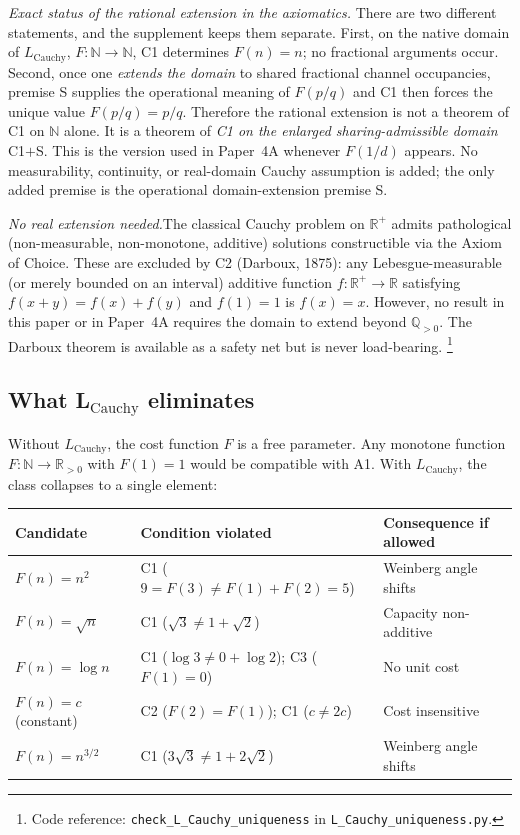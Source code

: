 \documentclass[11pt]{article}
\theoremstyle{definition}
\newcommand{\coderef}[2]{\footnote{Code reference: \texttt{#1} in \texttt{#2}.}}
\begin{document}
\smallskip\noindent\textit{Exact status of the rational extension in the axiomatics.}\quad
There are two different statements, and the supplement keeps them separate.
First, on the native domain of $L_{\mathrm{Cauchy}}$, $F:\mathbb{N}\to\mathbb{N}$, C1 determines $F(n)=n$; no fractional arguments occur.  Second, once one \emph{extends the domain} to shared fractional channel occupancies, premise S supplies the operational meaning of $F(p/q)$ and C1 then forces the unique value $F(p/q)=p/q$.  Therefore the rational extension is not a theorem of C1 on $\mathbb{N}$ alone.  It is a theorem of \emph{C1 on the enlarged sharing-admissible domain} C1$+$S.  This is the version used in Paper~4A whenever $F(1/d)$ appears.  No measurability, continuity, or real-domain Cauchy assumption is added; the only added premise is the operational domain-extension premise S.

\smallskip\noindent\textit{No real extension needed.}\quad The classical
Cauchy problem on $\mathbb{R}^+$ admits pathological (non-measurable,
non-monotone, additive) solutions constructible via the Axiom of Choice.
These are excluded by C2 (Darboux, 1875): any Lebesgue-measurable (or
merely bounded on an interval) additive function $f: \mathbb{R}^+ \to
\mathbb{R}$ satisfying $f(x+y) = f(x) + f(y)$ and $f(1) = 1$ is
$f(x) = x$.  However, no result in this paper or in Paper~4A requires
the domain to extend beyond $\mathbb{Q}_{>0}$.  The Darboux theorem is
available as a safety net but is never load-bearing.
\coderef{check\_L\_Cauchy\_uniqueness}{L\_Cauchy\_uniqueness.py}


\subsection{What L$_{\mathrm{Cauchy}}$ eliminates}
\label{sec:cauchy_consequences}

Without $L_{\mathrm{Cauchy}}$, the cost function $F$ is a free parameter.
Any monotone function $F: \mathbb{N} \to \mathbb{R}_{>0}$ with $F(1) = 1$
would be compatible with A1.  With $L_{\mathrm{Cauchy}}$, the class
collapses to a single element:

\smallskip
\begin{center}
\small
\begin{tabular}{@{}lll@{}}
\toprule
\textbf{Candidate} & \textbf{Condition violated} & \textbf{Consequence if allowed} \\
\midrule
$F(n) = n^2$ & C1 ($9 = F(3) \ne F(1) + F(2) = 5$) & Weinberg angle shifts \\
$F(n) = \sqrt{n}$ & C1 ($\sqrt{3} \ne 1 + \sqrt{2}$) & Capacity non-additive \\
$F(n) = \log n$ & C1 ($\log 3 \ne 0 + \log 2$); C3 ($F(1) = 0$) & No unit cost \\
$F(n) = c$ (constant) & C2 ($F(2) = F(1)$); C1 ($c \ne 2c$) & Cost insensitive \\
$F(n) = n^{3/2}$ & C1 ($3\sqrt{3} \ne 1 + 2\sqrt{2}$) & Weinberg angle shifts \\
\bottomrule
\end{tabular}
\end{center}
\end{document}
